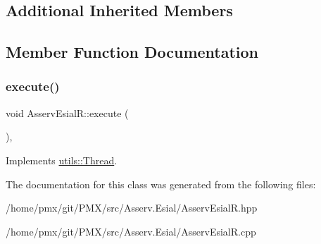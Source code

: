 \subsection*{Additional Inherited Members}


\subsection{Member Function Documentation}
\mbox{\label{classAsservEsialR_abfd3be9bde7bf8ae887688bf8bc0ca43}} 
\subsubsection{\texorpdfstring{execute()}{execute()}}
{\footnotesize\ttfamily void Asserv\+Esial\+R\+::execute (\begin{DoxyParamCaption}{ }\end{DoxyParamCaption})\hspace{0.3cm}{\ttfamily [protected]}, {\ttfamily [virtual]}}


\begin{DoxyItemize}
\item 
\end{DoxyItemize}

Implements \hyperlink{classutils_1_1Thread_a202b3fabad41b3be6d996043b262a43a}{utils\+::\+Thread}.



The documentation for this class was generated from the following files\+:\begin{DoxyCompactItemize}
\item 
/home/pmx/git/\+P\+M\+X/src/\+Asserv.\+Esial/Asserv\+Esial\+R.\+hpp\item 
/home/pmx/git/\+P\+M\+X/src/\+Asserv.\+Esial/Asserv\+Esial\+R.\+cpp\end{DoxyCompactItemize}
